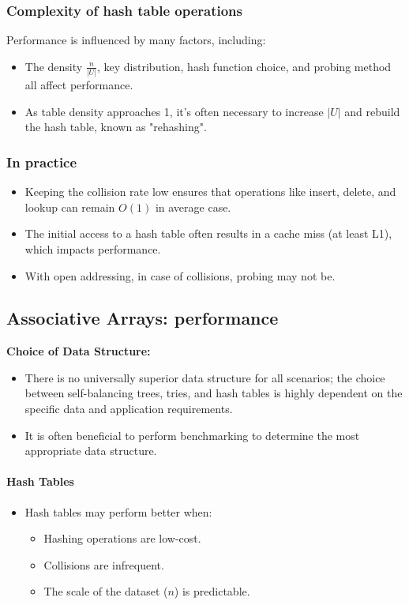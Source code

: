 \documentclass[12pt]{article}
\begin{document}
\subsubsection{Complexity of hash table operations}

Performance is influenced by many factors, including:
\begin{itemize}
    \item The density \( \frac{n}{|U|} \), key distribution, hash function choice, and probing method all affect performance.
    \item As table density approaches 1, it's often necessary to increase \( |U| \) and rebuild the hash table, known as "rehashing".
\end{itemize}

\subsubsection{In practice}
\begin{itemize}
    \item Keeping the collision rate low ensures that operations like insert, delete, and lookup can remain \( O(1) \) in average case.
    \item The initial access to a hash table often results in a cache miss (at least L1), which impacts performance.
    \item With open addressing, in case of collisions, probing may not be.
\end{itemize}

\subsection{Associative Arrays: performance}
\textbf{Choice of Data Structure:}
\begin{itemize}
    \item There is no universally superior data structure for all scenarios; the choice between self-balancing trees, tries, and hash tables is highly dependent on the specific data and application requirements.
    \item It is often beneficial to perform benchmarking to determine the most appropriate data structure.
\end{itemize}

\paragraph{Hash Tables}
\begin{itemize}
    \item Hash tables may perform better when:
    \begin{itemize}
        \item Hashing operations are low-cost.
        \item Collisions are infrequent.
        \item The scale of the dataset (\( n \)) is predictable.
    \end{itemize}
\end{itemize}
\end{document}
